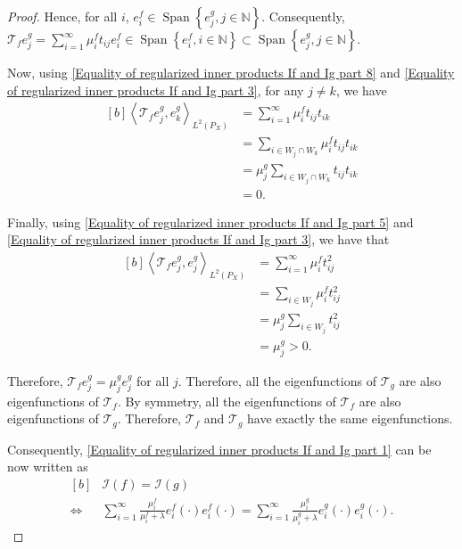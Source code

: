 \documentclass{article}
\theoremstyle{plain}
\newcommand{\inprod}[1]{\left \langle #1 \right\rangle}
\newcommand{\LPtwo}{L^{2}(P_{X})}
\begin{document}
\begin{proof}
    Hence, for all $i$, $e_{i}^{f} \in \operatorname{Span}\left\{e_{j}^{g}, j \in \mathbb{N}\right\}$. Consequently, $\mathcal{T}_{f} e_{j}^{g} = \sum_{i=1}^{\infty} \mu_{i}^{f}t_{ij}e_{i}^{f} \in \operatorname{Span}\left\{e_{i}^{f}, i \in \mathbb{N}\right\} \subset \operatorname{Span}\left\{e_{j}^{g}, j \in \mathbb{N}\right\}$. 

    Now, using \eqref{Equality of regularized inner products If and Ig part 8} and \eqref{Equality of regularized inner products If and Ig part 3}, for any $j \neq k$, we have
    \begin{equation*}
        \begin{aligned}[b]
            \inprod{\mathcal{T}_{f} e_{j}^{g},e_{k}^{g}}_{\LPtwo} &= \sum_{i=1}^{\infty} \mu_{i}^{f}t_{ij}t_{ik}\\
            &= \sum_{i \in W_{j}\cap W_{k}} \mu_{i}^{f}t_{ij}t_{ik}\\
            &= \mu_{j}^{g} \sum_{i \in W_{j}\cap W_{k}} t_{ij}t_{ik}\\
            &=0.
        \end{aligned}
    \end{equation*}

    Finally, using \eqref{Equality of regularized inner products If and Ig part 5} and \eqref{Equality of regularized inner products If and Ig part 3}, we have that
    \begin{equation*}
        \begin{aligned}[b]
            \inprod{\mathcal{T}_{f} e_{j}^{g},e_{j}^{g}}_{\LPtwo} &= \sum_{i=1}^{\infty} \mu_{i}^{f}t_{ij}^{2}\\
            &= \sum_{i \in W_{j}}\mu_{i}^{f}t_{ij}^{2}\\
            &= \mu_{j}^{g}\sum_{i \in W_{j}}t_{ij}^{2}\\
            &=\mu_{j}^{g} > 0.
        \end{aligned}
    \end{equation*}

    Therefore, $\mathcal{T}_{f} e_{j}^{g}=\mu_{j}^{g}  e_{j}^{g}$ for all $j$. Therefore, all the eigenfunctions of $\mathcal{T}_{g}$ are also eigenfunctions of $\mathcal{T}_{f}$. By symmetry, all the eigenfunctions of $\mathcal{T}_{f}$ are also eigenfunctions of $\mathcal{T}_{g}$. Therefore, $\mathcal{T}_{f}$ and $\mathcal{T}_{g}$ have exactly the same eigenfunctions. 

    Consequently, \eqref{Equality of regularized inner products If and Ig part 1} can be now written as
    \begin{equation}\label{Equality of regularized inner products If and Ig part 11}
        \begin{aligned}[b]
            &\mathcal{I}(f) = \mathcal{I}(g)\\
            \iff &\sum_{i=1}^{\infty} \frac{\mu_{i}^{f}}{\mu_{i}^{f} + \lambda} e_{i}^{f}(\cdot) e_{i}^{f}(\cdot) = \sum_{i=1}^{\infty} \frac{\mu_{i}^{g}}{\mu_{i}^{g} + \lambda} e_{i}^{g}(\cdot) e_{i}^{g}(\cdot) .
        \end{aligned}
    \end{equation}


\end{proof}
\end{document}
